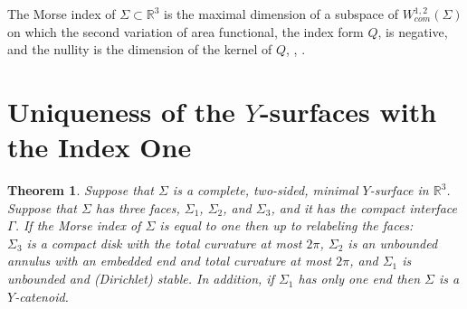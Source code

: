 \documentclass[10pt,a4paper]{amsart}
\theoremstyle{theorem}
\newtheorem{theorem}{Theorem}[section]
\theoremstyle{definition}
\numberwithin{equation}{section}
\begin{document}
\label{def: Morse Index} The Morse index of $\Sigma \subset \mathbb{R}^3$ is the maximal dimension of a subspace of $ W_{com}^{1,2} (\Sigma)$ on which the second variation of area functional, the index form $Q$, is negative, and the nullity is the dimension of the kernel of $Q$, \cite{wang2022curvature}, \cite{matinpour2024morse}.

	   

\section{Uniqueness of the $Y$-surfaces with the Index One}\label{sec: main result}

\begin{theorem} \label{thm: main thm}
          Suppose that $\Sigma$ is a complete, two-sided, minimal $Y$-surface in $\mathbb{R}^3$. Suppose that $\Sigma$ has three faces, $\Sigma_1$, $\Sigma_2$, and $\Sigma_3$, and it has the compact interface $\Gamma$. If the Morse index of $\Sigma$ is equal to one then up to relabeling the faces:\\
          $\Sigma_3$ is a compact disk with the total curvature at most $2\pi$, $\Sigma_2$ is an unbounded annulus with an embedded end and total curvature at most $2\pi$, and $\Sigma_1$ is unbounded and (Dirichlet) stable.
          In addition, if $\Sigma_1$ has only one end then $\Sigma$ is a $Y$-catenoid.
        
\end{theorem}
\end{document}
